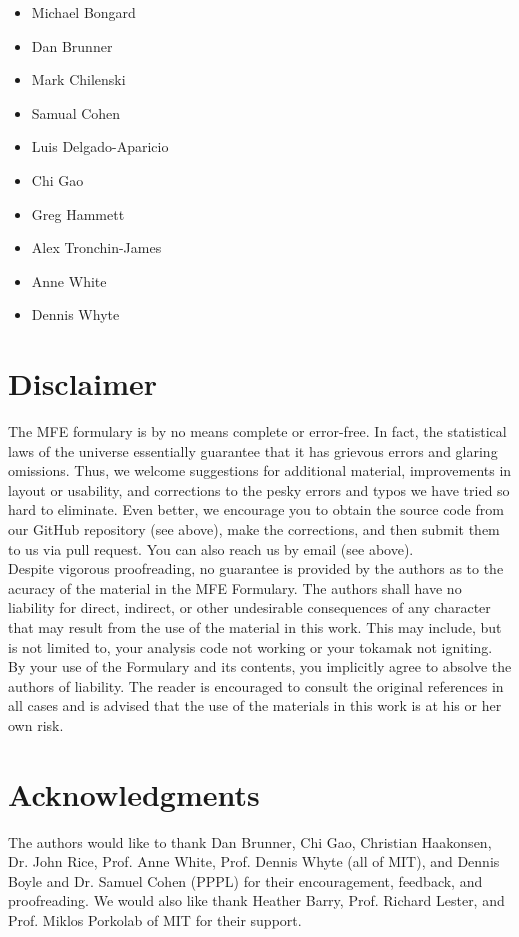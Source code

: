 \begin{multicols}{2}
\begin{itemize}
\item Michael Bongard
\item Dan Brunner
\item Mark Chilenski
\item Samual Cohen
\item Luis Delgado-Aparicio
\item Chi Gao
\item Greg Hammett 
\item Alex Tronchin-James
\item Anne White
\item Dennis Whyte 
\end{itemize}
\end{multicols}


\section*{Disclaimer}
The MFE formulary is by no means complete or error-free. In fact, the
statistical laws of the universe essentially guarantee that it has
grievous errors and glaring omissions. Thus, we welcome suggestions
for additional material, improvements in layout or usability, and
corrections to the pesky errors and typos we have tried so hard to
eliminate. Even better, we encourage you to obtain the source code
from our GitHub repository (see above), make the corrections, and then
submit them to us via pull request. You can also reach us by email
(see above).\\

\noindent
Despite vigorous proofreading, no guarantee is provided by the authors
as to the acuracy of the material in the MFE Formulary. The authors
shall have no liability for direct, indirect, or other undesirable
consequences of any character that may result from the use of the
material in this work. This may include, but is not limited to, your
analysis code not working or your tokamak not igniting. By your use of
the Formulary and its contents, you implicitly agree to absolve the
authors of liability. The reader is encouraged to consult the original
references in all cases and is advised that the use of the materials
in this work is at his or her own risk.

\section*{Acknowledgments}
The authors would like to thank Dan Brunner, Chi Gao, Christian
Haakonsen, Dr. John Rice, Prof. Anne White, Prof. Dennis Whyte (all of
MIT), and Dennis Boyle and Dr. Samuel Cohen (PPPL) for their
encouragement, feedback, and proofreading. We would also like thank
Heather Barry, Prof. Richard Lester, and Prof. Miklos Porkolab of MIT
for their support.\\


